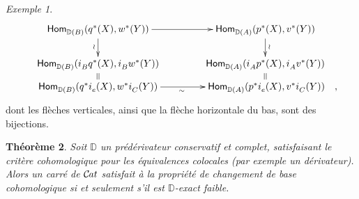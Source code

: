 \documentclass[francais]{smfart}
\theoremstyle{plain}
\newtheorem{thm}{Th\'eor\`eme}[section]
\theoremstyle{remark}
\newtheorem{ex}[thm]{Exemple}
\theoremstyle{definition}
\numberwithin{equation}{thm}
\begin{document}
\begin{ex}
\[
\xymatrixcolsep{3.5pc}
\xymatrixrowsep{.5pc}
\xymatrix{
{\operatorname{\mathsf{Hom}}}^{}_{{\mathbb{D}}(B)}(q^*(X),w^*(Y))\ar[dd]_{\wr}\ar[r]
&{\operatorname{\mathsf{Hom}}}^{}_{{\mathbb{D}}(A)}(p^*(X),v^*(Y))\ar[dd]^{\wr}
\\
\\
{\operatorname{\mathsf{Hom}}}^{}_{{\mathbb{D}}(B)}(i^{}_Bq^*(X),i^{}_Bw^*(Y))\ar@{=}[d]
&{\operatorname{\mathsf{Hom}}}^{}_{{\mathbb{D}}(A)}(i^{}_Ap^*(X),i^{}_Av^*(Y))\ar@{=}[d]
\\
{\operatorname{\mathsf{Hom}}}^{}_{{\mathbb{D}}(B)}(q^*i^{}_e(X),w^*i^{}_C(Y))\ar[r]_{\sim}
&{\operatorname{\mathsf{Hom}}}^{}_{{\mathbb{D}}(A)}(p^*i^{}_e(X),v^*i^{}_C(Y))\hskip 10pt,\hskip -15pt
}
\]
dont les flèches verticales, ainsi que la flèche horizontale du bas, sont des bijections.
\end{ex}

\begin{thm} \label{carcarexder} 
Soit ${\mathbb{D}}$ un prédérivateur conservatif et complet, satisfaisant le critère cohomologique pour les équivalences colocales \emph{(par exemple un dérivateur).} Alors un carré de ${{\mathcal{C} \mspace{-2.mu} \it{at}}}$ satisfait à la propriété de changement de base cohomologique si et seulement s'il est ${\mathbb{D}}${\nobreakdash}-exact faible.
\end{thm}
\end{document}
